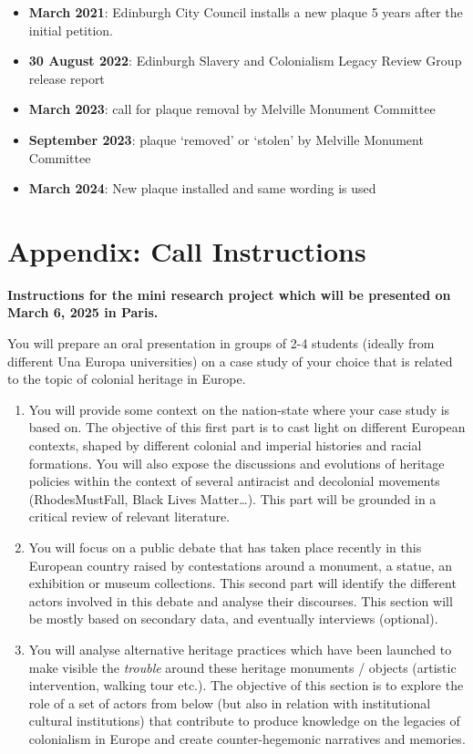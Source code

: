 \documentclass{scrartcl}
\renewcommand{\cite}{\parencite}
\begin{document}
\begin{appendices}
\begin{itemize}
    \item \textbf{March 2021}: Edinburgh City Council  installs a new plaque  \cite[][]{mccarthy_2022_1,anderson_2021} 5 years after the initial petition.
    \item \textbf{30 August 2022}: Edinburgh Slavery and Colonialism Legacy Review Group release report
    \item \textbf{March 2023}: call for plaque removal by Melville Monument Committee \cite[][]{bbc_2023_1}
    \item \textbf{September 2023}: plaque `removed' or `stolen' by Melville Monument Committee \cite[][]{bbc_2023_2,bbc_2024}
    \item \textbf{March 2024}: New plaque installed and same wording is used \cite[][]{bbc_2024, coec_2024} 
\end{itemize}

\section{Appendix: Call Instructions}
\textbf{Instructions for the mini research project which will be presented on March 6, 2025 in Paris.}

You will prepare an oral presentation in groups of 2-4 students (ideally from different Una Europa universities) on a case study of your choice that is related to the topic of colonial heritage in Europe. 



\begin{enumerate}
    \item You will provide some context on the nation-state where your case study is based on. The objective of this first part is to cast light on different European contexts, shaped by different colonial and imperial histories and racial formations. You will also expose the discussions and evolutions of heritage policies within the context of several antiracist and decolonial movements (RhodesMustFall, Black Lives Matter…). This part will be grounded in a critical review of relevant literature.
    \item You will focus on a public debate that has taken place recently in this European country raised by contestations around a monument, a statue, an exhibition or museum collections. This second part will identify the different actors involved in this debate and analyse their discourses. This section will be mostly based on secondary data, and eventually interviews (optional).
    \item  You will analyse alternative heritage practices which have been launched to make visible the \textit{trouble} around these heritage monuments / objects (artistic intervention, walking tour etc.). The objective of this section is to explore the role of a set of actors from below (but also in relation with institutional cultural institutions) that contribute to produce knowledge on the legacies of colonialism in Europe and create counter-hegemonic narratives and memories. 
\end{enumerate}


\end{appendices}
\end{document}
